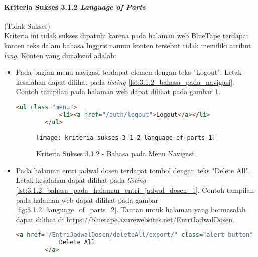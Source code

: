 \paragraph{Kriteria Sukses 3.1.2 \textit{Language of Parts}}
\label{par:kepatuhan_bluetape_kriteria_sukses_3.1.2}
(Tidak Sukses)\\

Kriteria ini tidak sukses dipatuhi karena pada halaman web BlueTape terdapat konten teks dalam bahasa Inggris namun konten tersebut tidak memiliki atribut \textit{lang}. Konten yang dimaksud adalah:

\begin{itemize}
    \item Pada bagian menu navigasi terdapat elemen dengan teks "Logout". Letak kesalahan dapat dilihat pada \textit{listing} \ref{lst:3.1.2_bahasa_pada_navigasi}. Contoh tampilan pada halaman web dapat dilihat pada gambar \ref{fig:3.1.2_language_of_parts_1}. 
    \begin{lstlisting}[frame=single, label={lst:3.1.2_bahasa_pada_navigasi}, language=HTML, caption=Kriteria Sukses 3.1.2 - Bahasa yang Tidak Sesuai pada Menu Navigasi]
        <ul class="menu">
            <li><a href="/auth/logout">Logout</a></li>
        </ul>
    \end{lstlisting}
    
    \begin{figure}[H]
        \centering  
        \texttt{[image: kriteria-sukses-3-1-2-language-of-parts-1]}  
        \caption[Kriteria Sukses 3.1.2 - Bahasa pada Menu Navigasi]{Kriteria Sukses 3.1.2 - Bahasa pada Menu Navigasi}
        \label{fig:3.1.2_language_of_parts_1}  
    \end{figure}

    \item Pada halaman entri jadwal dosen terdapat tombol dengan teks "Delete All". Letak kesalahan dapat dilihat pada \textit{listing} \ref{lst:3.1.2_bahasa_pada_halaman_entri_jadwal_dosen_1}. Contoh tampilan pada halaman web dapat dilihat pada gambar \ref{fig:3.1.2_language_of_parts_2}. Tautan untuk halaman yang bermasalah dapat dilihat di \url{https://bluetape.azurewebsites.net/EntriJadwalDosen}.
    \begin{lstlisting}[frame=single, label={lst:3.1.2_bahasa_pada_halaman_entri_jadwal_dosen_1}, language=HTML, caption=Kriteria Sukses 3.1.2 - Bahasa yang Tidak Sesuai pada Halaman Entri Jadwal Dosen 1]
        <a href="/EntriJadwalDosen/deleteAll/export/" class="alert button" onClick="return konfirmasi();">
            Delete All
        </a>
    \end{lstlisting}
    

\end{itemize}
